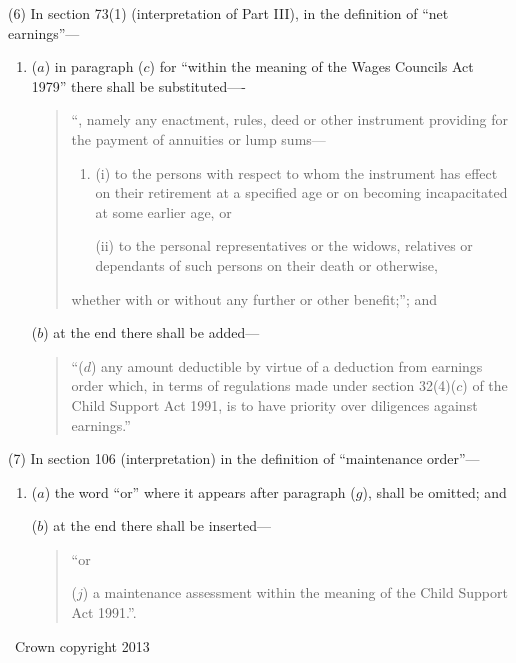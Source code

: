 \documentclass[12pt,a4paper]{article}
\begin{document}
(6) In section 73(1) (interpretation of Part III), in the definition of “net earnings”---
\begin{enumerate}\item[]
($a$) in paragraph ($c$) for “within the meaning of the Wages Councils Act 1979” there shall be substituted----
\begin{quotation}  “, namely any enactment, rules, deed or other instrument providing for the payment of annuities or lump sums---
\begin{enumerate}\item[]
(i) to the persons with respect to whom the instrument has effect on their retirement at a specified age or on becoming incapacitated at some earlier age, or

(ii) to the personal representatives or the widows, relatives or dependants of such persons on their death or otherwise,
\end{enumerate}
whether with or without any further or other benefit;”; and
\end{quotation}

($b$) at the end there shall be added—
\begin{quotation}
“($d$) any amount deductible by virtue of a deduction from earnings order which, in terms of regulations made under section 32(4)($c$) of the Child Support Act 1991, is to have priority over diligences against earnings.”
\end{quotation}
\end{enumerate}

(7) In section 106 (interpretation) in the definition of “maintenance order”—
\begin{enumerate}\item[]
($a$) the word “or” where it appears after paragraph ($g$), shall be omitted; and

($b$) at the end there shall be inserted---
\begin{quotation}  “or

($j$) a maintenance assessment within the meaning of the Child Support Act 1991.”.
\end{quotation}
\end{enumerate}



\begin{center}
\textcopyright\ Crown copyright 2013
\end{center}
\end{document}
